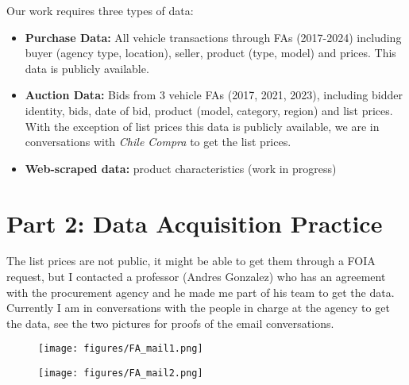 \documentclass[12pt]{article}
\theoremstyle{plain}
\theoremstyle{plain}
\begin{document}
Our work requires three types of data: 

\begin{itemize}
  \item \textbf{Purchase Data:}  All vehicle transactions through FAs (2017-2024) including buyer (agency type, location), seller, product (type, model) and prices. This data is publicly available. 
  \item \textbf{Auction Data:}  Bids from 3 vehicle FAs (2017, 2021, 2023), including bidder identity, bids, date of bid, product (model, category, region) and list prices. With the exception of list prices this data is publicly available, we are in conversations with \textit{Chile Compra} to get the list prices. 
  \item \textbf{Web-scraped data:} product characteristics (work in progress)
\end{itemize}


\section{ Part 2: Data Acquisition Practice}

The list prices are  not public, it might be able to get them through a FOIA request, but I contacted a professor (Andres Gonzalez) who has an agreement with the procurement agency and he made me part of his team to get the data. Currently I am in conversations with the people in charge at the agency to get the data, see the two pictures for proofs of the email conversations. 

\newpage 

\begin{figure}[H]
    \centering
    \texttt{[image: figures/FA\_mail1.png]}
    \label{fig:enter-label}
\end{figure}

 \begin{figure}[H]
    \centering
    \texttt{[image: figures/FA\_mail2.png]}
    \label{fig:enter-label}
\end{figure}
 
\end{document}
